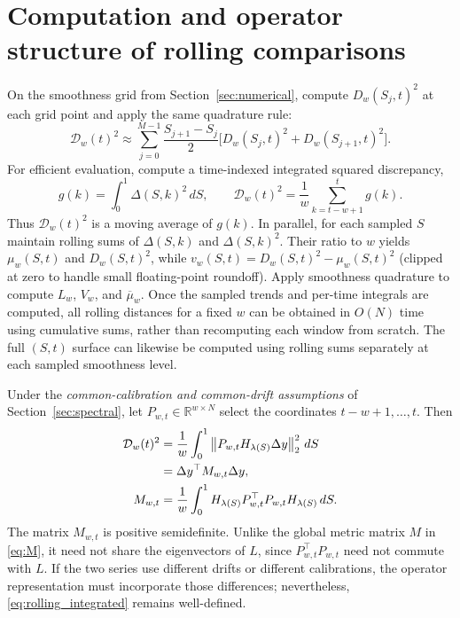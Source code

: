 \documentclass[10pt,letterpaper]{article}
\newcommand{\R}{\mathbb{R}}
\newcommand{\norm}[1]{\left\lVert#1\right\rVert}
\begin{document}
\section{Computation and operator structure of rolling comparisons}
\label{sec:rolling_computation}
On the smoothness grid from Section~\ref{sec:numerical}, compute
$D_w(S_j,t)^2$ at each grid point and apply the same quadrature rule:
\begin{equation}\label{eq:rolling_quad}
  \mathcal D_w(t)^2\approx
  \sum_{j=0}^{M-1}\frac{S_{j+1}-S_j}{2}
    \bigl[D_w(S_j,t)^2+D_w(S_{j+1},t)^2\bigr].
\end{equation}
For efficient evaluation, compute a time-indexed integrated
squared discrepancy,
\begin{equation}\label{eq:qtime}
  g(k)=\int_0^1\Delta(S,k)^2\,dS,\qquad
  \mathcal D_w(t)^2=\frac1w\sum_{k=t-w+1}^{t}g(k).
\end{equation}
Thus $\mathcal D_w(t)^2$ is a moving average of $g(k)$.
In parallel, for each sampled $S$ maintain rolling sums of
$\Delta(S,k)$ and $\Delta(S,k)^2$. Their ratio to $w$ yields
$\mu_w(S,t)$ and $D_w(S,t)^2$, while
$v_w(S,t)=D_w(S,t)^2-\mu_w(S,t)^2$ (clipped at zero to handle
small floating-point roundoff). Apply smoothness quadrature to compute
$L_w$, $V_w$, and $\overline\mu_w$.
Once the sampled trends and per-time integrals are computed, all
rolling distances for a fixed $w$ can be obtained in $O(N)$ time using
cumulative sums, rather than recomputing each window from scratch.
The full $(S,t)$ surface can likewise be computed using rolling sums
separately at each sampled smoothness level.

Under the \emph{common-calibration and common-drift assumptions} of
Section~\ref{sec:spectral}, let $P_{w,t}\in\R^{w\times N}$ select the
coordinates $t-w+1,\ldots,t$. Then
\begin{align}
\mathcal D_w(t)^2
 &=\frac1w\int_0^1
 \norm{P_{w,t}H_{\lambda(S)}\Delta y}_2^2\,dS\notag\\
 &=\Delta y^\top M_{w,t}\Delta y,\label{eq:rolling_operator}\\
M_{w,t}
 &=\frac1w\int_0^1 H_{\lambda(S)}P_{w,t}^\top
 P_{w,t}H_{\lambda(S)}\,dS.\notag
\end{align}
The matrix $M_{w,t}$ is positive semidefinite. Unlike the global
metric matrix $M$ in \eqref{eq:M}, it need not share the eigenvectors of
$L$, since $P_{w,t}^\top P_{w,t}$ need not commute with $L$.
If the two series use different drifts or different calibrations, the
operator representation must incorporate those differences; nevertheless,
\eqref{eq:rolling_integrated} remains well-defined.
\end{document}
